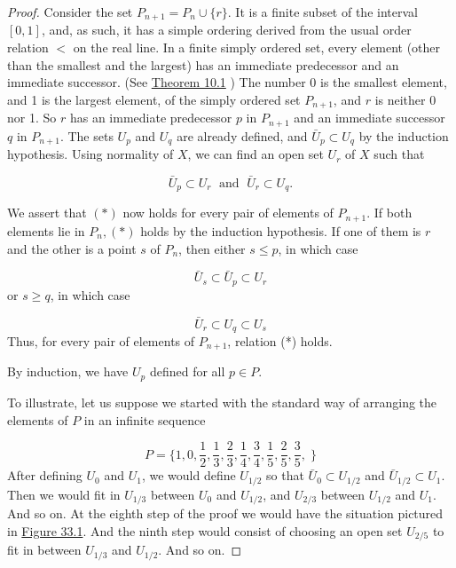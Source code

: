 \begin{proof}
Consider the set \(P_{n + 1} = P_{n} \cup \{ r\}\). It is a finite subset of the interval \([ {0,1}]\), and, as such, it has a simple ordering derived from the usual order relation \(<\) on the real line. In a finite simply ordered set, every element (other than the smallest and the largest) has an immediate predecessor and an immediate successor. (See \hyperref[thm:10.1]{Theorem 10.1} ) The number 0 is the smallest element, and 1 is the largest element, of the simply ordered set \(P_{n + 1}\), and \(r\) is neither 0 nor 1. So \(r\) has an immediate predecessor \(p\) in \(P_{n + 1}\) and an immediate successor \(q\) in \(P_{n + 1}\). The sets \(U_{p}\) and \(U_{q}\) are already defined, and \(\bar{U}_{p} \subset {U}_{q}\) by the induction hypothesis. Using normality of \(X\), we can find an open set \(U_{r}\) of \(X\) such that

\[
\bar{U}_{p} \subset {U}_{r}\;\text{ and }\;\bar{U}_{r} \subset {U}_{q}.
\]

We assert that \(( *)\) now holds for every pair of elements of \(P_{n + 1}\). If both elements lie in \(P_{n},( *)\) holds by the induction hypothesis. If one of them is \(r\) and the other is a point \(s\) of \(P_{n}\), then either \(s \leq p\), in which case

\[
\bar{U}_{s} \subset {\bar{U}}_{p} \subset {U}_{r}
\]
or \(s \geq q\), in which case

\[
\bar{U}_{r} \subset {U}_{q} \subset {U}_{s}
\]
Thus, for every pair of elements of \(P_{n + 1}\), relation (*) holds.


By induction, we have \(U_{p}\) defined for all \(p \in P\).

To illustrate, let us suppose we started with the standard way of arranging the elements of \(P\) in an infinite sequence

\[
P = \{ 1,0,\frac{1}{2},\frac{1}{3},\frac{2}{3},\frac{1}{4},\frac{3}{4},\frac{1}{5},\frac{2}{5},\frac{3}{5},\;\}
\]
After defining \(U_{0}\) and \(U_{1}\), we would define \(U_{1/2}\) so that \(\bar{U}_{0} \subset {U}_{1/2}\) and \(\bar{U}_{1/2} \subset {U}_{1}\). Then we would fit in \(U_{1/3}\) between \(U_{0}\) and \(U_{1/2}\), and \(U_{2/3}\) between \(U_{1/2}\) and \(U_{1}\). And so on. At the eighth step of the proof we would have the situation pictured in \hyperref[fig:33.1]{Figure 33.1}. And the ninth step would consist of choosing an open set \(U_{2/5}\) to fit in between \(U_{1/3}\) and \(U_{1/2}\). And so on.


\end{proof}

